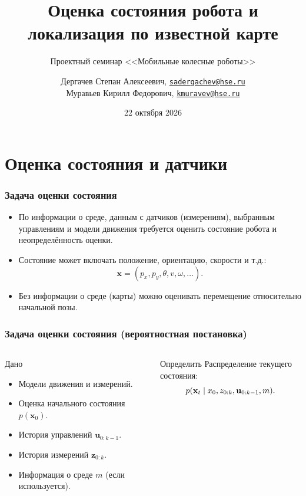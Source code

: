\documentclass[aspectratio=169]{beamer}
\title[Мобильные колесные роботы]{Оценка состояния робота и локализация по известной карте}
\subtitle{Проектный семинар <<Мобильные колесные роботы>>}
\author[Команда курса]{Дергачев Степан  Алексеевич, \texttt{\href{mailto:sadergachev@hse.ru}{sadergachev@hse.ru}} \\ Муравьев Кирилл Федорович, \texttt{\href{mailto:kmuravev@hse.ru}{kmuravev@hse.ru}}}
\institute{Факультет компьютерных наук НИУ ВШЭ}
\date{22 октября 2026}
\begin{document}
\frame[plain]{\titlepage}

\section{Оценка состояния и датчики}

\begin{frame}
\frametitle{Задача оценки состояния}
\small
\begin{itemize}
  \item По информации о среде, данным с датчиков (измерениям), выбранным управлениям и модели движения требуется оценить состояние робота и неопределённость оценки.
  \item Состояние может включать положение, ориентацию, скорости и т.д.:
  \[ \mathbf x=(p_x,p_y,\theta,v,\omega, \ldots). \]
  \item Без информации о среде (карты) можно оценивать перемещение относительно начальной позы.
\end{itemize}
\end{frame}

\begin{frame}
\frametitle{Задача оценки состояния (вероятностная постановка)}
\small
\begin{columns}[T]
\begin{block}{Дано}
\begin{itemize}
  \item Модели движения и измерений.
  \item Оценка начального состояния $p(\mathbf x_0)$.
  \item История управлений $\mathbf u_{0:k-1}$.
  \item История измерений $\mathbf z_{0:k}$.
  \item Информация о среде $m$ (если используется).
\end{itemize}
\end{block}
\begin{block}{Определить}
Распределение текущего состояния:
\[
 p(\mathbf x_t\mid\mathbf \mathbf x_0, z_{0:k},\mathbf u_{0:k-1}, m).
\]
\end{block}
\end{columns}
\end{frame}
\end{document}
